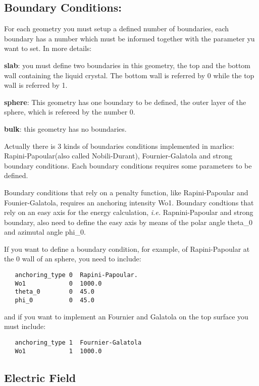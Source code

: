 \documentclass{article}
\begin{document}
\subsection{Boundary Conditions:}\label{boundary.params}

For each geometry you must setup a defined number of boundaries, each
boundary has a number which must be informed together with the
parameter yu want to set. In more details:

\textbf{slab}: you must define two boundaries in this geometry, the
top and the bottom wall containing the liquid crystal. The bottom wall
is referred by 0 while the top wall is referred by 1.

\textbf{sphere}: This geometry has one boundary to be defined, the
outer layer of the sphere, which is refereed by the number 0.

\textbf{bulk}: this geometry has no boundaries.

Actually there is 3 kinds of boundaries conditions implemented in
marlics: Rapini-Papoular(also called Nobili-Durant), Fournier-Galatola and strong
boundary conditions. Each boundary conditions requires some parameters
to be defined.

Boundary conditions that rely on a penalty function, like
  Rapini-Papoular and Founier-Galatola, requires an anchoring
intensity Wo1. Boundary condtions that rely on an easy axis for the
energy calculation, \textit{i.e.} Rapnini-Papoular and
  strong boundary, also need to define the easy axis by means of the
polar angle theta_0 and azimutal angle phi_0.

If you want to define a boundary condition, for example, of
Rapini-Papoular at the 0 wall of an sphere, you need to include:
\begin{lstlisting}
   anchoring_type 0  Rapini-Papoular.
   Wo1            0  1000.0
   theta_0        0  45.0
   phi_0          0  45.0	
\end{lstlisting}
and if you want to implement an Fournier and Galatola on the top
surface you must include:

\begin{lstlisting}
   anchoring_type 1  Fournier-Galatola
   Wo1            1  1000.0
\end{lstlisting}

\subsection{Electric Field}\label{field.params}
\end{document}

